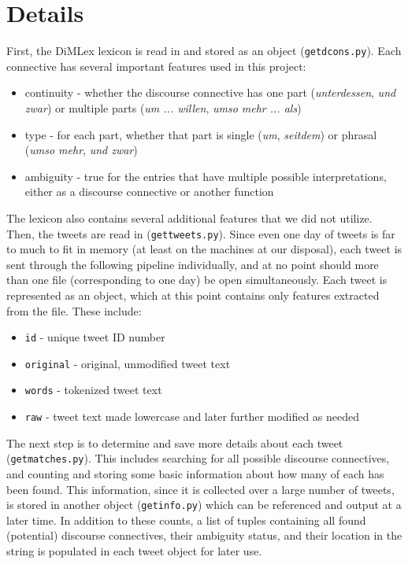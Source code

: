 \documentclass[11pt]{article}
\def\mono#1{\texttt{#1}}  %
\begin{document}
\section{Details}

First, the DiMLex lexicon is read in and stored as an object (\mono{get\textunderscore dcons.py}).  Each connective has several important features used in this project:
\begin{itemize}
\renewcommand\labelitemi{--}
\item continuity - whether the discourse connective has one part (\emph{unterdessen}, \emph{und zwar}) or multiple parts (\emph{um ... willen}, \emph{umso mehr ... als})
\item type - for each part, whether that part is single (\emph{um}, \emph{seitdem}) or phrasal (\emph{umso mehr}, \emph{und zwar})
\item ambiguity - true for the entries that have multiple possible interpretations, either as a discourse connective or  another function
\end{itemize}
 The lexicon also contains several additional features that we did not utilize. \\
 
Then, the tweets are read in (\mono{get\textunderscore tweets.py}).  Since even one day of tweets is far to much to fit in memory (at least on the machines at our disposal), each tweet is sent through the following pipeline individually, and at no point should more than one file (corresponding to one day) be open simultaneously.  Each tweet is represented as an object, which at this point contains only features extracted from the file.  These include:
\begin{itemize}
\renewcommand\labelitemi{--}
\item \mono{id} - unique tweet ID number
\item \mono{\textunderscore original} - original, unmodified tweet text
\item \mono{words} - tokenized tweet text
\item \mono{raw} - tweet text made lowercase and later further modified as needed
\end{itemize} 

The next step is to determine and save more details about each tweet (\mono{get\textunderscore matches.py}).  This includes searching for all possible discourse connectives, and counting and storing some basic information about how many of each has been found.  This information, since it is collected over a large number of tweets, is stored in another object (\mono{get\textunderscore info.py}) which can be referenced and output at a later time.  In addition to these counts, a list of tuples containing all found (potential) discourse connectives, their ambiguity status, and their location in the string is populated in each tweet object for later use.\\
\end{document}
